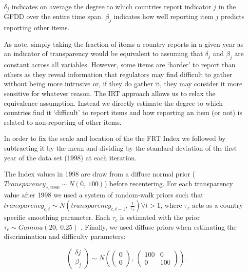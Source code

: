 \documentclass[a4paper]{article}
\begin{document}
\noindent $\delta_{j}$ indicates on average the degree to which countries report indicator $j$ in the GFDD over the entire time span. $\beta_{j}$ indicates how well reporting item $j$ predicts reporting other items. 

As \cite{Hollyer2014} note, simply taking the fraction of items a country reports in a given year as an indicator of transparency would be equivalent to assuming that $\delta_{j}$ and $\beta_{j}$ are constant across all variables. However, some items are `harder' to report than others as they reveal information that regulators may find difficult to gather without being more intrusive or, if they do gather it, they may consider it more sensitive for whatever reason. The IRT approach allows us to relax the equivalence assumption. Instead we directly estimate the degree to which countries find it `difficult' to report items and how reporting an item (or not) is related to non-reporting of other items.

In order to fix the scale and location of the the FRT Index we followed \cite{Hollyer2014} by subtracting it by the mean and dividing by the standard deviation of the first year of the data set (1998) at each iteration. 

The Index values in 1998 are draw from a diffuse normal prior ($Transparency_{c,1980} \sim N(0,\:100)$) before recentering. For each transparency value after 1998 we used a system of random-walk priors such that $transparency_{c,t} \sim N(transparency_{c,t-1},\: \frac{1}{\tau_{c}}) \forall t > 1$, where $\tau_{c}$ acts as a country-specific smoothing parameter. Each $\tau_{c}$ is estimated with the prior $\tau_{c} \sim Gamma(20,\:0.25)$ \citep[for more details see][8]{Jackman2009,Hollyer2014}. Finally, we used diffuse priors when estimating the discrimination and difficulty parameters:

\begin{equation}
    \begin{pmatrix}
      \delta{j} \\
      \beta_{j}
    \end{pmatrix} 
    \sim N 
    \left(
        \begin{pmatrix} 
            0 \\
            0 
        \end{pmatrix}
            ,\:
        \begin{pmatrix} 
            100 & 0 \\
            0 & 100
        \end{pmatrix}
    \right). 
\end{equation}
\end{document}
